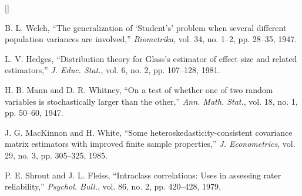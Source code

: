 \documentclass[12pt,letterpaper]{article}
\begin{document}
\begin{list}{[]}{\setlength{\leftmargin}{2.2em}\setlength{\labelwidth}{1.8em}\setlength{\labelsep}{0.4em}\setlength{\itemsep}{0pt}\setlength{\parsep}{0pt}}
\item B. L. Welch, ``The generalization of `Student's' problem when several different population variances are involved,'' \emph{Biometrika}, vol. 34, no. 1--2, pp. 28--35, 1947.
\item L. V. Hedges, ``Distribution theory for Glass's estimator of effect size and related estimators,'' \emph{J. Educ. Stat.}, vol. 6, no. 2, pp. 107--128, 1981.
\item H. B. Mann and D. R. Whitney, ``On a test of whether one of two random variables is stochastically larger than the other,'' \emph{Ann. Math. Stat.}, vol. 18, no. 1, pp. 50--60, 1947.
\item J. G. MacKinnon and H. White, ``Some heteroskedasticity-consistent covariance matrix estimators with improved finite sample properties,'' \emph{J. Econometrics}, vol. 29, no. 3, pp. 305--325, 1985.
\item P. E. Shrout and J. L. Fleiss, ``Intraclass correlations: Uses in assessing rater reliability,'' \emph{Psychol. Bull.}, vol. 86, no. 2, pp. 420--428, 1979.
\end{list}
\endgroup
\end{document}
